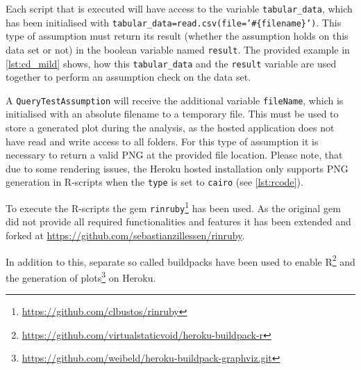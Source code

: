 Each script that is executed will have access to the variable \texttt{tabular\_data}, which has been initialised with \texttt{tabular\_data=read.csv(file='\#\{filename\}')}. This type of assumption must return its result (whether the assumption holds on this data set or not) in the boolean variable named \texttt{result}. The provided example in \cref{lst:cd_mild} shows, how this \texttt{tabular\_data} and the \texttt{result} variable are used together to perform an assumption check on the data set.

A \texttt{QueryTestAssumption} will receive the additional variable \texttt{fileName}, which is initialised with an absolute filename to a temporary file. This must be used to store a generated plot during the analysis, as the hosted application does not have read and write access to all folders. For this type of assumption it is necessary to return a valid PNG at the provided file location. Please note, that due to some rendering issues, the Heroku hosted installation only supports PNG generation in R-scripts when the \texttt{type} is set to \texttt{cairo} (see \cref{lst:rcode}).

To execute the \gls{R}-scripts the gem \texttt{rinruby}\footnote{\url{https://github.com/clbustos/rinruby}} has been used. As the original gem did not provide all required functionalities and features it has been extended and forked at \href{https://github.com/sebastianzillessen/rinruby}{https://github.com/sebastianzillessen/rinruby}. 

In addition to this, separate so called buildpacks have been used to enable \gls{R}\footnote{\url{https://github.com/virtualstaticvoid/heroku-buildpack-r}} and the generation of plots\footnote{\url{https://github.com/weibeld/heroku-buildpack-graphviz.git}} on Heroku. 

